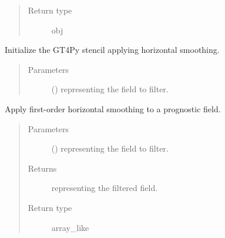 \documentclass[letterpaper,10pt,english]{sphinxmanual}
\begin{document}
\begin{fulllineitems}
\begin{fulllineitems}
\begin{quote}
\begin{description}
\item[{Return type}] \leavevmode
obj

\end{description}\end{quote}

\end{fulllineitems}


\begin{fulllineitems}
\label{\detokenize{api:dycore.horizontal_smoothing.HorizontalSmoothingFirstOrderXZ._stencil_initialize}}
Initialize the GT4Py stencil applying horizontal smoothing.
\begin{quote}\begin{description}
\item[{Parameters}] \leavevmode
{} () \textendash{}  representing the field to filter.

\end{description}\end{quote}

\end{fulllineitems}


\begin{fulllineitems}
\label{\detokenize{api:dycore.horizontal_smoothing.HorizontalSmoothingFirstOrderXZ.apply}}
Apply first-order horizontal smoothing to a prognostic field.
\begin{quote}\begin{description}
\item[{Parameters}] \leavevmode
{} () \textendash{}  representing the field to filter.

\item[{Returns}] \leavevmode
{} representing the filtered field.

\item[{Return type}] \leavevmode
array\_like

\end{description}\end{quote}

\end{fulllineitems}


\end{fulllineitems}
\end{document}
